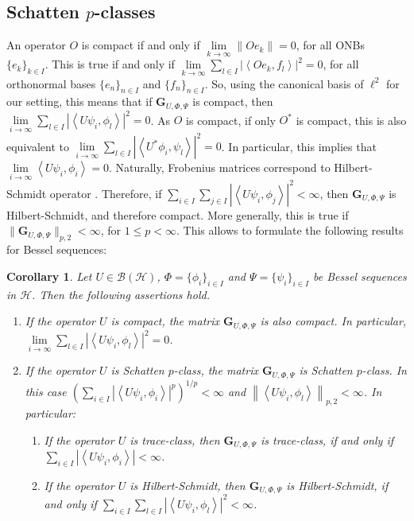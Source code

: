 \documentclass{birkjour}
\newtheorem{cor}[thm]{Corollary}
\theoremstyle{definition}
\theoremstyle{remark}
\numberwithin{equation}{section}
\newcommand{\BL}[1]{
{\mathcal B} \left( #1 \right)
}
\begin{document}
\subsection{Schatten $p$-classes}
An operator $O$ is compact if and only if \cite{weidm80} $\lim \limits_{k \rightarrow \infty} \| O e_k \| = 0$, for all ONBs $\{e_k\}_{k\in I}$. This is true if and only if $\lim \limits_{k \rightarrow \infty} \sum \limits_{l\in I} \left| \left< O e_k, f_l \right> \right|^2 = 0$, for all orthonormal
 bases $\{ e_n \}_{n\in I}$ and $\{ f_n \}_{n\in I}$.
So, using the canonical  basis of $\ell^2$ for our setting, this
  means that if $\mathbf{G}_{U,\Phi,\Psi}$ is compact, then $\lim \limits_{i\rightarrow \infty} \sum \limits_{l\in I}  \left|
\left\langle U\psi_{i},\phi_{l}\right\rangle \right|^2=0$. As $O$
is compact, if only $O^*$ is compact, this is also equivalent to $
\lim \limits_{i\rightarrow \infty} \sum \limits_{l\in I}  \left|
\left\langle U^*\phi_{i},\psi_{l}\right\rangle \right|^2=0 $.
In particular, this implies that $\lim \limits_{i\rightarrow
\infty}  \left\langle U\psi_{i},\phi_{i}\right\rangle =0$.
Naturally, Frobenius matrices correspond to Hilbert-Schmidt
operator \cite{xxlphd1}. Therefore, if $\sum_{i\in I}\sum_{j\in
I}\left|\left\langle
U\psi_{i},\phi_{j}\right\rangle\right|^{2}<\infty$, then
$\mathbf{G}_{U,\Phi,\Psi}$ is Hilbert-Schmidt, and therefore
compact. More generally, this is true if $\|
\mathbf{G}_{U,\Phi,\Psi}\|_{p,2} < \infty$, for $1\le p < \infty$. 
This allows to formulate the following results for Bessel
sequences:
\begin{cor} \label{sec:schattenmat1}
Let $U\in \BL{\mathcal{H}}$, $\Phi=\{\phi_{i}\}_{i\in I}$ and $\Psi=\{\psi_{i}\}_{i\in I}$
be Bessel sequences in $\mathcal{H}$.
Then the following assertions hold.
\begin{enumerate}
\item[(1)]  If the operator $U$ is compact, the matrix $\mathbf{G}_{U,\Phi,\Psi}$ is also compact. In particular, $\lim \limits_{i\rightarrow \infty} \sum \limits_{l\in I}  | \left< U \psi_{i},\phi_{l} \right> |^2=0$.
\item[(2)]  If the operator $U$ is Schatten $p$-class, the matrix $\mathbf{G}_{U,\Phi,\Psi}$ is Schatten $p$-class. In this case $\left(\sum \limits_{i\in I} \left| \left< U \psi_{i},\phi_{i} \right> \right|^p \right)^{1/p}<\infty$ and $\left\|\left< U \psi_{i},\phi_{l} \right> \right\|_{p,2} < \infty$. 
In particular:
\begin{enumerate}
\item[(2a.)] If the operator $U$ is trace-class, then $\mathbf{G}_{U,\Phi,\Psi}$ is trace-class, if and only if  $\sum \limits_{i\in I} \left| \left< U \psi_{i},\phi_{i} \right> \right| < \infty$. 
\item[(2b.)] If the operator $U$ is Hilbert-Schmidt, then $\mathbf{G}_{U,\Phi,\Psi}$ is Hilbert-Schmidt, if and only if $\sum \limits_{i\in I}\sum \limits_{l\in I}\left|\left\langle U\psi_{i},\phi_{l}\right\rangle\right|^{2}<\infty$.
\end{enumerate}
 \end{enumerate}
\end{cor}
\end{document}

